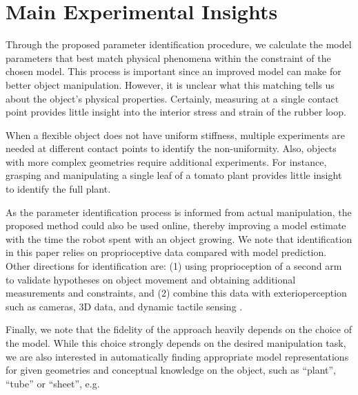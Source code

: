 \documentclass[runningheads,a4paper]{llncs}
\begin{document}


\section{Main Experimental Insights}
Through the proposed parameter identification procedure, we calculate the model parameters that best match physical phenomena within the constraint of the chosen model.  This process is important since an improved model can make for better object manipulation.  However, it is unclear what this matching tells us about the object's physical properties.  Certainly, measuring at a single contact point provides little insight into the interior stress and strain of the rubber loop.

When a flexible object does not have uniform stiffness, multiple experiments are needed at different contact points to identify the non-uniformity.  Also, objects with more complex geometries require additional experiments.  For instance, grasping and manipulating a single leaf of a tomato plant provides little insight to identify the full plant.

As the parameter identification process is informed from actual manipulation, the proposed method could also be used online, thereby improving a model estimate with the time the robot spent with an object growing. We note that identification in this paper relies on proprioceptive data compared with model prediction. Other directions for identification are: (1) using proprioception of a second arm to validate hypotheses on object movement and obtaining additional measurements and constraints, and (2) combine this data with exterioperception such as cameras, 3D data, and dynamic tactile sensing \cite{hughes2014}. 

Finally, we note that the fidelity of the approach heavily depends on the choice of the model. While this choice strongly depends on the desired manipulation task, we are also interested in automatically finding appropriate model representations for given geometries and conceptual knowledge on the object, such as ``plant'', ``tube'' or ``sheet'', e.g.  




\end{document}
